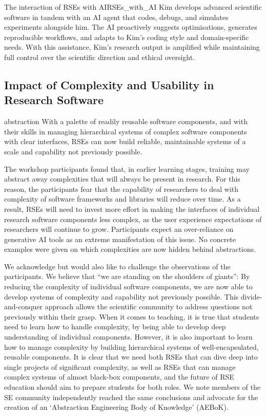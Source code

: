 \documentclass{eceasst}
\begin{document}
\begin{story}{The interaction of RSEs with AI}{RSEs_with_AI}
Kim develops advanced scientific software in tandem with an AI agent that codes,
debugs, and simulates experiments alongside him. The AI proactively suggests optimisations,
generates reproducible workflows, and adapts to Kim’s coding style and domain-specific needs.
With this assistance, Kim's research output is amplified while maintaining full control over the scientific direction and ethical oversight.
\end{story}

\subsection{Impact of Complexity and Usability in Research Software}
\label{sec:complexity}
\begin{whatis}{}{abstraction}
With a palette of readily reusable software components,
and with their skills in managing hierarchical systems of complex software components with clear interfaces,
RSEs can now build reliable, maintainable systems of a scale and capability not previously possible.
\end{whatis}

The workshop participants found that, in earlier learning stages,
training may abstract away complexities that will always be present in research.
For this reason, the participants fear that the capability of researchers to deal with complexity
of software frameworks and libraries will reduce over time.
As a result, RSEs will need to invest more effort in making the interfaces of individual research software components
less complex, as the user experience expectations of researchers will continue to grow.
Participants expect an over-reliance on generative AI tools as an extreme manifestation of this issue.
No concrete examples were given on which complexities are now hidden behind abstractions.

We acknowledge but would also like to challenge the observations of the participants.
We believe that ``we are standing on the shoulders of giants'':
By reducing the complexity of individual software components,
we are now able to develop systems of complexity and capability not previously possible.
This divide-and-conquer approach allows the scientific community to address questions not previously within their grasp.
When it comes to teaching, it is true that students need to learn how to handle complexity,
by being able to develop deep understanding of individual components.
However, it is also important to learn how to manage complexity
by building hierarchical systems of well-encapsulated, reusable components.
It is clear that we need both RSEs that can dive deep into single projects of significant complexity,
as well as RSEs that can manage complex systems of almost black-box components,
and the future of RSE education should aim to prepare students for both roles.
We note members of the SE community independently reached the same conclusions
and advocate for the creation of an `Abstraction Engineering Body of Knowledge'
(AEBoK)\cite{Bencomo2024AEBoK}.
\end{document}
